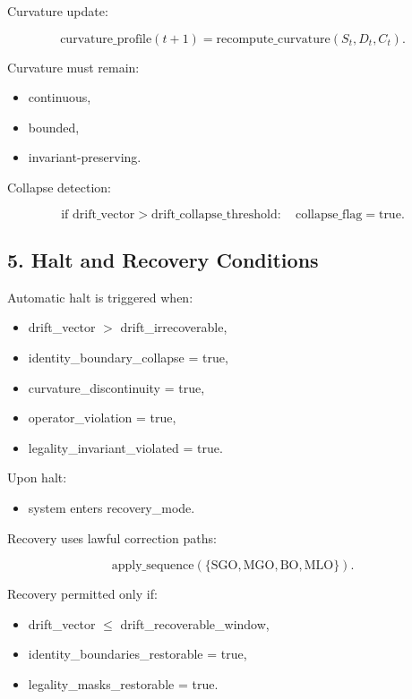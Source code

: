 Curvature update:



\[
\text{curvature\_profile}(t+1) = \text{recompute\_curvature}(S_t, D_t, C_t).
\]



Curvature must remain:
\begin{itemize}[leftmargin=1.2cm]
    \item continuous,
    \item bounded,
    \item invariant-preserving.
\end{itemize}

Collapse detection:



\[
\text{if } \text{drift\_vector} > \text{drift\_collapse\_threshold}:
\quad \text{collapse\_flag} = \text{true}.
\]



\subsection*{5. Halt and Recovery Conditions}
\label{boot:dsup_halt_recovery}

Automatic halt is triggered when:
\begin{itemize}[leftmargin=1.2cm]
    \item drift\_vector $>$ drift\_irrecoverable,
    \item identity\_boundary\_collapse = true,
    \item curvature\_discontinuity = true,
    \item operator\_violation = true,
    \item legality\_invariant\_violated = true.
\end{itemize}

Upon halt:
\begin{itemize}[leftmargin=1.2cm]
    \item system enters recovery\_mode.
\end{itemize}

Recovery uses lawful correction paths:



\[
\text{apply\_sequence}(\{\text{SGO}, \text{MGO}, \text{BO}, \text{MLO}\}).
\]



Recovery permitted only if:
\begin{itemize}[leftmargin=1.2cm]
    \item drift\_vector $\leq$ drift\_recoverable\_window,
    \item identity\_boundaries\_restorable = true,
    \item legality\_masks\_restorable = true.
\end{itemize}

